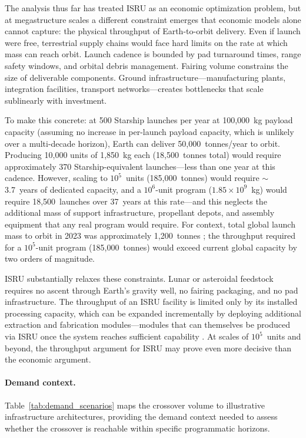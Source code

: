 \documentclass[preprint,12pt]{elsarticle}
\begin{document}
The analysis thus far has treated ISRU as an economic optimization problem, but at megastructure scales a different constraint emerges that economic models alone cannot capture: the physical throughput of Earth-to-orbit delivery. Even if launch were free, terrestrial supply chains would face hard limits on the rate at which mass can reach orbit. Launch cadence is bounded by pad turnaround times, range safety windows, and orbital debris management. Fairing volume constrains the size of deliverable components. Ground infrastructure---manufacturing plants, integration facilities, transport networks---creates bottlenecks that scale sublinearly with investment.

To make this concrete: at 500 Starship launches per year at 100{,}000~kg payload capacity (assuming no increase in per-launch payload capacity, which is unlikely over a multi-decade horizon), Earth can deliver 50{,}000~tonnes/year to orbit. Producing 10{,}000 units of 1{,}850~kg each (18{,}500~tonnes total) would require approximately 370 Starship-equivalent launches---less than one year at this cadence. However, scaling to $10^5$~units (185{,}000~tonnes) would require $\sim$3.7~years of dedicated capacity, and a $10^6$-unit program ($1.85 \times 10^9$~kg) would require 18{,}500~launches over 37~years at this rate---and this neglects the additional mass of support infrastructure, propellant depots, and assembly equipment that any real program would require. For context, total global launch mass to orbit in 2023 was approximately 1{,}200~tonnes \cite{jones2022}; the throughput required for a $10^5$-unit program (185{,}000~tonnes) would exceed current global capacity by two orders of magnitude.

ISRU substantially relaxes these constraints. Lunar or asteroidal feedstock requires no ascent through Earth's gravity well, no fairing packaging, and no pad infrastructure. The throughput of an ISRU facility is limited only by its installed processing capacity, which can be expanded incrementally by deploying additional extraction and fabrication modules---modules that can themselves be produced via ISRU once the system reaches sufficient capability \cite{metzger2013}. At scales of $10^5$~units and beyond, the throughput argument for ISRU may prove even more decisive than the economic argument.

\paragraph{Demand context.} Table~\ref{tab:demand_scenarios} maps the crossover volume to illustrative infrastructure architectures, providing the demand context needed to assess whether the crossover is reachable within specific programmatic horizons.
\end{document}
